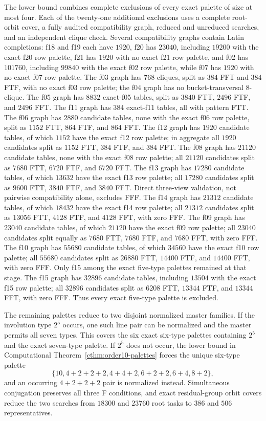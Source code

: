 The lower bound combines complete exclusions of every exact palette of size
at most four.  Each of the twenty-one additional exclusions uses a complete
root-orbit cover, a fully audited compatibility graph, reduced and
unreduced searches, and an independent clique check.  Several compatibility
graphs contain Latin completions: f18 and f19 each have $1920$, f20 has
$23040$, including $19200$ with the exact f20 row palette, f21 has $1920$
with no exact f21 row palette, and f02 has $101760$, including $99840$ with
the exact f02 row palette, while f07 has $1920$ with no exact f07 row palette.
The f03 graph has $768$ cliques, split as $384$ FFT and $384$ FTF, with no
exact f03 row palette; the f04 graph has no bucket-transversal $8$-clique.
The f05 graph has $8832$ exact-f05 tables, split as $3840$ FTT, $2496$ FTF,
and $2496$ FFT.  The f11 graph has $384$ exact-f11 tables, all with pattern
FTT.  The f06 graph has $2880$ candidate tables, none with the exact f06 row
palette, split as $1152$ FTT, $864$ FTF, and $864$ FFT.  The f12 graph has
$1920$ candidate tables, of which $1152$ have the exact f12 row palette; in
aggregate all $1920$ candidates split as $1152$ FTT, $384$ FTF, and $384$ FFT.
The f08 graph has $21120$ candidate tables, none with the exact f08 row
palette; all $21120$ candidates split as $7680$ FTT, $6720$ FTF, and $6720$ FFT. The f13
graph has $17280$ candidate tables, of which $13632$ have the exact f13 row
palette; all $17280$ candidates split as $9600$ FTT, $3840$ FTF, and $3840$ FFT. Direct
three-view validation, not pairwise compatibility alone, excludes FFF.  The
f14 graph has $21312$ candidate tables, of which $18432$ have the exact f14
row palette; all $21312$ candidates split as $13056$ FTT, $4128$ FTF, and $4128$ FFT, with zero
FFF.  The f09 graph has $23040$ candidate tables, of which $21120$ have the
exact f09 row palette; all $23040$ candidates split equally as $7680$ FTT, $7680$ FTF, and
$7680$ FFT, with zero FFF.  The f10 graph has $55680$ candidate tables, of
which $34560$ have the exact f10 row palette; all $55680$ candidates split as $26880$ FTT,
$14400$ FTF, and $14400$ FFT, with zero FFF.  Only f15 among the exact
five-type palettes remained at that stage. The f15 graph has $32896$
candidate tables, including $13504$ with the exact f15 row palette; all
$32896$ candidates split as $6208$ FTT, $13344$ FTF, and $13344$ FFT, with zero FFF. Thus every
exact five-type palette is excluded.

The remaining palettes reduce to two disjoint normalized master families.
If the involution type $2^5$ occurs, one such line pair can be normalized and
the master permits all seven types.  This covers the six exact six-type
palettes containing $2^5$ and the exact seven-type palette.  If $2^5$ does not
occur, the lower bound in Computational
Theorem~\ref{cthm:order10-palettes} forces the unique six-type palette
\[
 \{10,4+2+2+2,4+4+2,6+2+2,6+4,8+2\},
\]
and an occurring $4+2+2+2$ pair is normalized instead.  Simultaneous
conjugation preserves all three F conditions, and exact residual-group orbit
covers reduce the two searches from $18300$ and $23760$ root tasks to $386$
and $506$ representatives.

